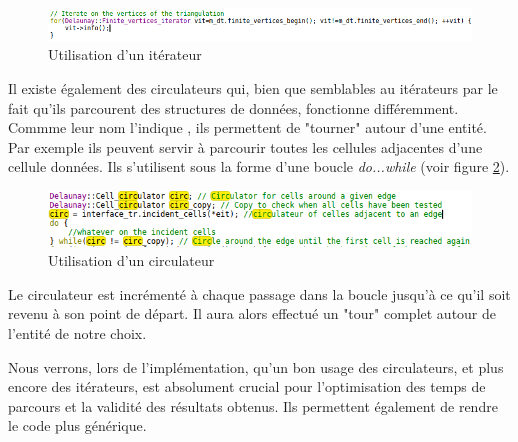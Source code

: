 \begin{figure}[ht]
\centering
  \includegraphics[width=\textwidth]{figures/access_it.png}
  \caption{Utilisation d'un itérateur}
  \label{fig::access_it}
\end{figure}


Il existe également des circulateurs qui, bien que semblables au itérateurs par le fait
qu'ils parcourent des structures de données, fonctionne différemment. Commme leur nom
l'indique , ils permettent de "tourner" autour d'une entité. Par exemple ils peuvent
servir à parcourir toutes les cellules adjacentes d'une cellule données. Ils s'utilisent
sous la forme d'une boucle \textit{do...while} (voir figure \ref{fig::circ_ex}).
\begin{figure}[ht]
\centering
  \includegraphics[width=\textwidth]{figures/circ_ex.png}
  \caption{Utilisation d'un circulateur}
  \label{fig::circ_ex}
\end{figure}
 Le circulateur est incrémenté à chaque
passage dans la boucle jusqu'à ce qu'il soit revenu à son point de départ. Il aura alors
effectué un "tour" complet autour de l'entité de notre choix.


Nous verrons, lors de l'implémentation, qu'un bon usage des circulateurs, et plus encore des itérateurs,
est absolument crucial pour l'optimisation des temps de parcours et la validité
des résultats obtenus. Ils permettent également de rendre le code plus générique.
